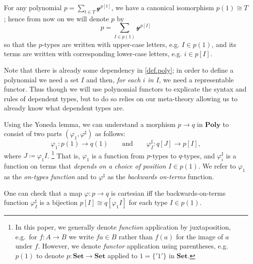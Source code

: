 \documentclass[11pt, one side, article]{memoir}
\theoremstyle{definition}
\theoremstyle{plain}
\newenvironment{remark}
  {\pushQED{\qed}\renewcommand{\qedsymbol}{$\lozenge$}\remarkx}
  {\popQED\endremarkx}
\newcommand{\Cat}[1]{\mathbf{#1}}%
\newcommand{\smset}{\Cat{Set}}
\newcommand{\yon}{\mathcal{y}}
\newcommand{\poly}{\Cat{Poly}}
\newcommand{\0}{\textsf{0}}
\newcommand{\1}{\tn{\textsf{1}}}
\newcommand{\qqand}{\qquad\text{and}\qquad}
\begin{document}
For any polynomial $p=\sum_{t\in T}\yon^{p[t]}$, we have a canonical isomorphism $p(1)\cong T$; hence from now on we will denote $p$ by
\begin{equation}\label{eqn.poly_notation}
p=\sum_{I\in p(1)}\yon^{p[I]}
\end{equation}
so that the $p$-types are written with upper-case letters, e.g. $I\in p(1)$, and its terms are written with corresponding lower-case letters, e.g. $i\in p[I]$.

\begin{remark}
Note that there is already some dependency in \cref{def.poly}; in order to define a polynomial we need a set $I$ and then, \emph{for each $i$ in $I$}, we need a representable functor. Thus though we will use polynomial functors to explicate the syntax and rules of dependent types, but to do so relies on our meta-theory allowing us to already know what dependent types are.
\end{remark}

\begin{remark}\label{rem.positions_and_directions}
Using the Yoneda lemma, we can understand a morphism $p\to q$ in $\poly$ to consist of two parts $(\varphi_1,\varphi^\sharp)$ as follows:
\begin{equation}\label{eqn.mapsharp}
  \varphi_1\colon p(1)\to q(1)
  \qqand
  \varphi^\sharp_I\colon q[J]\to p[I],
\end{equation}
where $J\coloneqq\varphi_1 I$.%
\footnote{
In this paper, we generally denote \emph{function} application by juxtaposition, e.g.\ for $f\colon A\to B$ we write $fa\in B$ rather than $f(a)$ for the image of $a$ under $f$. However, we denote \emph{functor} application using parentheses, e.g.\ $p(1)$ to denote $p\colon\smset\to\smset$ applied to $1=\{{'1'}\}$ in $\smset$.
}
 That is, $\varphi_1$ is a function from $p$-types to $q$-types, and $\varphi^\sharp_i$ is a function on terms that \emph{depends on a choice of position $I\in p(1)$}. We refer to $\varphi_1$ as the \emph{on-types function} and to $\varphi^\sharp$ as the \emph{backwards on-terms} function.

One can check that a map $\varphi\colon p\to q$ is cartesian iff the backwards-on-terms function $\varphi^\sharp_I$ is a bijection $p[I]\cong q[\varphi_1I]$ for each type $I\in p(1)$.
\end{remark}
\end{document}

